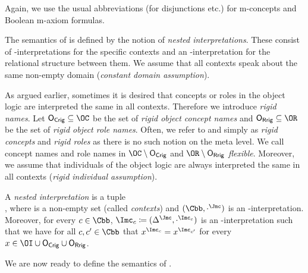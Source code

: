 Again, we use the usual abbreviations (for disjunctions etc.) for m-concepts and
Boolean m-axiom formulas.

The semantics of \LMLO is defined by the notion of \emph{nested interpretations}.  These consist of
\Osig-interpretations for the specific contexts and an \Msig-interpretation for the relational
structure between them.  We assume that all contexts speak about the same non-empty domain
(\emph{constant domain assumption}).


As argued earlier, sometimes it is desired that concepts or roles in the object logic are
interpreted the same in all contexts. Therefore we introduce \emph{rigid names}. Let
$\OCR\subseteq\OC$ be the set of \emph{rigid object concept names} and $\ORR\subseteq\OR$ be the set
of \emph{rigid object role names}.
%
Often, we refer to \OCR and \ORR simply as \emph{rigid concepts} and \emph{rigid roles} as there is
no such notion on the meta level.
%
We call concept names and role names in $\OC\setminus\OCR$ and $\OR\setminus\ORR$ \emph{flexible}.
%
Moreover, we assume that individuals of the object logic are always interpreted the same in all
contexts (\emph{rigid individual assumption}). 


\begin{definition}\label{def:nested-interpretation}
  A \emph{nested interpretation} is a tuple \\ \JJ, where \Cbb is a non-empty set
  (called \emph{contexts}) and $(\Cbb,\cdot^\J)$ is an \Msig-interpretation.
  Moreover, for every $c\in\Cbb$, $\I_c\coloneqq(\Delta^{\J},\cdot^{\I_c})$ is an
  \Osig-interpretation such that we have for all $c,c'\in\Cbb$ that $x^{\I_{c}}=x^{\I_{c'}}$ for
  every $x\in\OI\cup\OCR\cup\ORR$.
\end{definition}

We are now ready to define the semantics of \LMLO.

